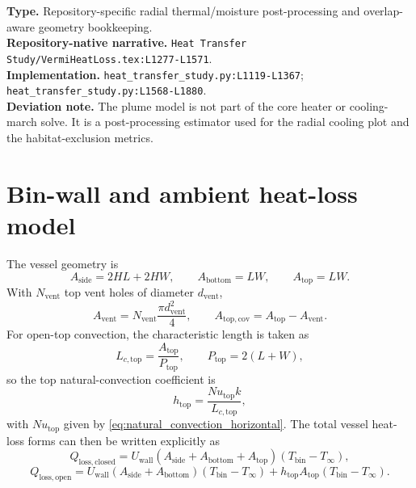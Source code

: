 \documentclass[11pt]{article}
\newcommand{\srcref}[1]{\nolinkurl{#1}}
\newcommand{\filepath}[1]{\nolinkurl{#1}}
\begin{document}
\textbf{Type.} Repository-specific radial thermal/moisture post-processing and overlap-aware geometry bookkeeping. \\
\textbf{Repository-native narrative.} \filepath{Heat Transfer Study/VermiHeatLoss.tex:L1277-L1571}. \\
\textbf{Implementation.} \srcref{heat_transfer_study.py:L1119-L1367}; \srcref{heat_transfer_study.py:L1568-L1880}. \\
\textbf{Deviation note.} The plume model is not part of the core heater or cooling-march solve. It is a post-processing estimator used for the radial cooling plot and the habitat-exclusion metrics.

\section{Bin-wall and ambient heat-loss model}
The vessel geometry is
\begin{equation}
\label{eq:bin_areas}
A_{\mathrm{side}}=2HL+2HW,
\qquad
A_{\mathrm{bottom}}=LW,
\qquad
A_{\mathrm{top}}=LW.
\end{equation}
With \(N_{\mathrm{vent}}\) top vent holes of diameter \(d_{\mathrm{vent}}\),
\begin{equation}
\label{eq:vent_area}
A_{\mathrm{vent}}=N_{\mathrm{vent}}\frac{\pi d_{\mathrm{vent}}^2}{4},
\qquad
A_{\mathrm{top,cov}}=A_{\mathrm{top}}-A_{\mathrm{vent}}.
\end{equation}
For open-top convection, the characteristic length is taken as
\begin{equation}
\label{eq:top_characteristic_length}
L_{c,\mathrm{top}}=\frac{A_{\mathrm{top}}}{P_{\mathrm{top}}},
\qquad
P_{\mathrm{top}}=2(L+W),
\end{equation}
so the top natural-convection coefficient is
\begin{equation}
\label{eq:top_convection_h}
h_{\mathrm{top}}=\frac{Nu_{\mathrm{top}}k}{L_{c,\mathrm{top}}},
\end{equation}
with \(Nu_{\mathrm{top}}\) given by \eqref{eq:natural_convection_horizontal}. The total vessel heat-loss forms can then be written explicitly as
\begin{equation}
\label{eq:q_loss_closed}
Q_{\mathrm{loss,closed}}=
U_{\mathrm{wall}}(A_{\mathrm{side}}+A_{\mathrm{bottom}}+A_{\mathrm{top}})(T_{\mathrm{bin}}-T_\infty),
\end{equation}
\begin{equation}
\label{eq:q_loss_open}
Q_{\mathrm{loss,open}}=
U_{\mathrm{wall}}(A_{\mathrm{side}}+A_{\mathrm{bottom}})(T_{\mathrm{bin}}-T_\infty)
+h_{\mathrm{top}}A_{\mathrm{top}}(T_{\mathrm{bin}}-T_\infty).
\end{equation}
\end{document}
